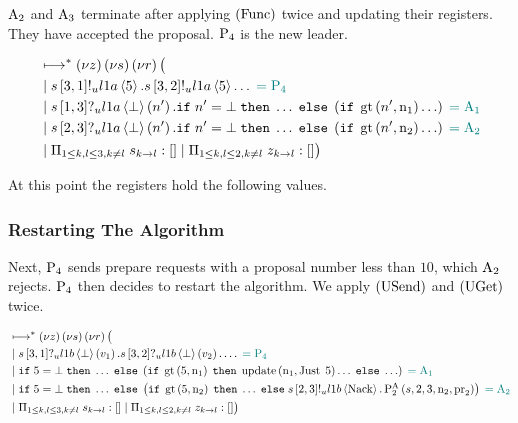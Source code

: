 $\operatorname{A_{2}}$ and $\operatorname{A_{3}}$ terminate after applying $\left(\operatorname{Func}\right)$ twice and updating their registers.
They have accepted the proposal.
$\operatorname{P_{4}}$ is the new leader.

\begin{align*}
&\longmapsto^*\left(\nu z\right)\left(\nu s\right)\left(\nu r\right)\big (\\
&\; | \;
s\left[3, 1\right]!_u l1a \left\langle 5 \right\rangle.
s\left[3, 2\right]!_u l1a \left\langle 5 \right\rangle\ldots
\;\textcolor{teal}{= \operatorname{P_{4}}}\\
&\; | \;
    s\left[1, 3\right]?_u l1a \left\langle \bot \right\rangle \left(n'\right).
    \mathtt{if}\; n' = \bot
    \;\mathtt{then}\; \ldots
    \;\mathtt{else}\; \left(
        \mathtt{if}\; \operatorname{gt}\left(n', \operatorname{n}_1\right)
        \ldots
    \right)
    \;\textcolor{teal}{= \operatorname{A_{1}}}\\
&\; | \;
    s\left[2, 3\right]?_u l1a \left\langle \bot \right\rangle \left(n'\right).
    \mathtt{if}\; n' = \bot
    \;\mathtt{then}\; \ldots
    \;\mathtt{else}\; \left(
        \mathtt{if}\; \operatorname{gt}\left(n', \operatorname{n}_2\right)
        \ldots
    \right)
    \;\textcolor{teal}{= \operatorname{A_{2}}}\\
&\; | \; \Pi_{1 \le k,l \le 3, k \neq l}\; s_{k\to l}:[]
\; | \; \Pi_{1 \le k,l \le 2, k \neq l}\; z_{k\to l}:[]
\big )
\end{align*}

At this point the registers hold the following values.


\subsubsection{Restarting The Algorithm}
Next, $\operatorname{P_{4}}$ sends prepare requests with a proposal number less than $10$, which $\operatorname{A_{2}}$ rejects.
$\operatorname{P_{4}}$ then decides to restart the algorithm.
We apply $\left(\operatorname{USend}\right)$ and $\left(\operatorname{UGet}\right)$ twice.

\begin{align*}
&\longmapsto^*\left(\nu z\right)\left(\nu s\right)\left(\nu r\right)\big (\\
&\; | \;
    s\left[3, 1\right]?_u l1b \left\langle \bot \right\rangle \left(v_1\right).
    s\left[3, 2\right]?_u l1b \left\langle \bot \right\rangle \left(v_2\right).
    \ldots
    \;\textcolor{teal}{= \operatorname{P_{4}}}\\
&\; | \;
    \mathtt{if}\; 5 = \bot
    \;\mathtt{then}\; \ldots
    \;\mathtt{else}\; \left(
        \mathtt{if}\; \operatorname{gt}\left(5, \operatorname{n}_1\right)
        \;\mathtt{then}\; \operatorname{update} \left(\operatorname{n}_1, \operatorname{Just}\; 5\right)\ldots
        \;\mathtt{else}\; \ldots
    \right)
    \;\textcolor{teal}{= \operatorname{A_{1}}}\\
&\; | \;
    \mathtt{if}\; 5 = \bot
    \;\mathtt{then}\; \ldots
    \;\mathtt{else}\; \left(
        \mathtt{if}\; \operatorname{gt}\left(5, \operatorname{n}_2\right)
        \;\mathtt{then}\; \ldots
        \;\mathtt{else}\;
            s\left[2, 3\right]!_u l1b \left\langle \operatorname{Nack} \right\rangle.
            \textstyle\operatorname{P^{A}_{2}}\left(s, 2, 3, \operatorname{n}_2, \operatorname{pr}_2\right)
    \right)
    \;\textcolor{teal}{= \operatorname{A_{2}}}\\
&\; | \; \Pi_{1 \le k,l \le 3, k \neq l}\; s_{k\to l}:[]
\; | \; \Pi_{1 \le k,l \le 2, k \neq l}\; z_{k\to l}:[]
\big )
\end{align*}

